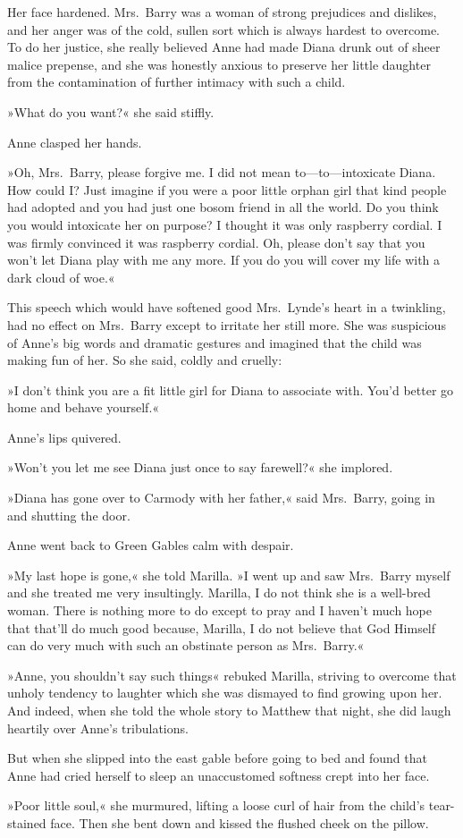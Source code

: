Her face hardened. Mrs.~Barry was a woman of strong prejudices and dislikes, and her anger was of the cold, sullen sort which is always hardest to overcome. To do her justice, she really believed Anne had made Diana drunk out of sheer malice prepense, and she was honestly anxious to preserve her little daughter from the contamination of further intimacy with such a child.

»What do you want?« she said stiffly.

Anne clasped her hands.

»Oh, Mrs.~Barry, please forgive me. I did not mean to—to—intoxicate Diana. How could I? Just imagine if you were a poor little orphan girl that kind people had adopted and you had just one bosom friend in all the world. Do you think you would intoxicate her on purpose? I thought it was only raspberry cordial. I was firmly convinced it was raspberry cordial. Oh, please don't say that you won't let Diana play with me any more. If you do you will cover my life with a dark cloud of woe.«

This speech which would have softened good Mrs.~Lynde's heart in a twinkling, had no effect on Mrs.~Barry except to irritate her still more. She was suspicious of Anne's big words and dramatic gestures and imagined that the child was making fun of her. So she said, coldly and cruelly:

»I don't think you are a fit little girl for Diana to associate with. You'd better go home and behave yourself.«

Anne's lips quivered.

»Won't you let me see Diana just once to say farewell?« she implored.

»Diana has gone over to Carmody with her father,« said Mrs.~Barry, going in and shutting the door.

Anne went back to Green Gables calm with despair.

»My last hope is gone,« she told Marilla. »I went up and saw Mrs.~Barry myself and she treated me very insultingly. Marilla, I do not think she is a well-bred woman. There is nothing more to do except to pray and I haven't much hope that that'll do much good because, Marilla, I do not believe that God Himself can do very much with such an obstinate person as Mrs.~Barry.«

»Anne, you shouldn't say such things« rebuked Marilla, striving to overcome that unholy tendency to laughter which she was dismayed to find growing upon her. And indeed, when she told the whole story to Matthew that night, she did laugh heartily over Anne's tribulations.

But when she slipped into the east gable before going to bed and found that Anne had cried herself to sleep an unaccustomed softness crept into her face.

»Poor little soul,« she murmured, lifting a loose curl of hair from the child's tear-stained face. Then she bent down and kissed the flushed cheek on the pillow.